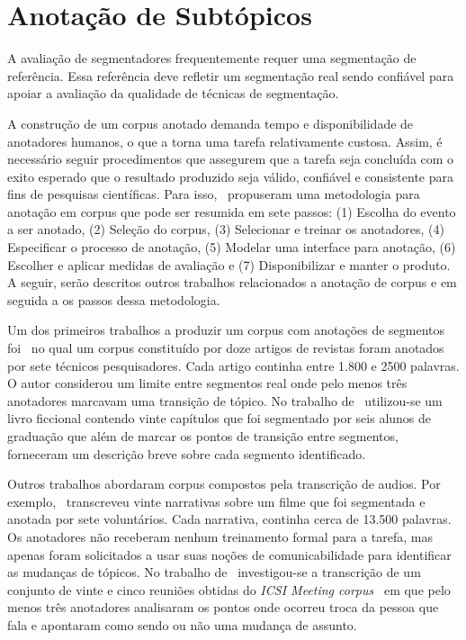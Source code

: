 \section{Anotação de Subtópicos}
\label{sec:anotacoes}
A avaliação de segmentadores frequentemente requer uma segmentação de referência. Essa referência deve refletir um segmentação real sendo confiável para apoiar a avaliação da qualidade de técnicas de segmentação. 

A construção de um corpus anotado demanda tempo e disponibilidade de anotadores humanos, o que a torna uma tarefa relativamente custosa. 
Assim, é necessário seguir procedimentos que assegurem que a tarefa seja concluída com o exito esperado que o resultado produzido seja válido, confiável e consistente para fins de pesquisas científicas. Para isso,~\cite{Hovy2010} propuseram uma metodologia para anotação em corpus que pode ser resumida em sete passos: 
(1) Escolha do evento a ser anotado, %
(2) Seleção do corpus,%
(3) Selecionar e treinar os anotadores,
(4) Especificar o processo de anotação,
(5) Modelar uma interface para anotação,
(6) Escolher e aplicar medidas de avaliação e 
(7) Disponibilizar e manter o produto.
% 
A seguir, serão descritos outros trabalhos relacionados a anotação de corpus e em seguida a os passos dessa metodologia. %

Um dos primeiros trabalhos a produzir um corpus com anotações de segmentos foi~\cite{Hearst1997} no qual um corpus constituído por doze artigos de revistas foram anotados por sete técnicos pesquisadores. Cada artigo continha entre 1.800 e 2500 palavras. O autor considerou um limite entre segmentos real onde pelo menos três anotadores marcavam uma transição de tópico. No trabalho de~\cite{Kazantseva2012} utilizou-se um livro ficcional contendo vinte capítulos que foi segmentado por seis alunos de graduação que além de marcar os pontos de transição entre segmentos, forneceram um descrição breve sobre cada segmento identificado. 

Outros trabalhos abordaram corpus compostos pela transcrição de audios. Por exemplo,~\cite{Passonneau1997} transcreveu vinte narrativas sobre um filme que foi segmentada e anotada por sete voluntários. Cada narrativa, continha cerca de 13.500 palavras. Os anotadores não receberam nenhum treinamento formal para a tarefa, mas apenas foram solicitados a usar suas noções de comunicabilidade para identificar as mudanças de tópicos. No trabalho de~\cite{Galley2003} investigou-se a transcrição de um conjunto de vinte e cinco reuniões obtidas do \textit{ICSI Meeting corpus}~\cite{Janin2003} em que pelo menos três anotadores analisaram os pontos onde ocorreu troca da pessoa que fala e apontaram como sendo ou não uma mudança de assunto.  


